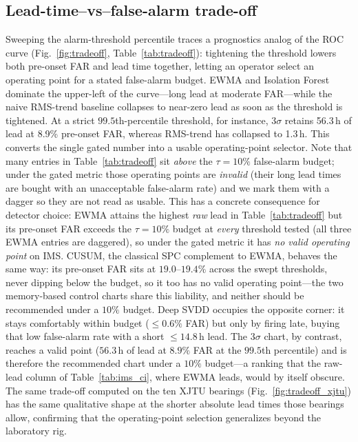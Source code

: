 \documentclass[journal]{IEEEtran}
\begin{document}
\subsection{Lead-time--vs--false-alarm trade-off}
Sweeping the alarm-threshold percentile traces a prognostics analog of the ROC
curve (Fig.~\ref{fig:tradeoff}, Table~\ref{tab:tradeoff}): tightening the
threshold lowers both pre-onset FAR and lead time together, letting an operator
select an operating point for a stated false-alarm budget. EWMA and Isolation
Forest dominate the upper-left of the curve---long lead at moderate FAR---while
the naive RMS-trend baseline collapses to near-zero lead as soon as the
threshold is tightened. At a strict $99.5$th-percentile threshold, for instance,
3$\sigma$ retains 56.3\,h of lead at 8.9\% pre-onset FAR, whereas RMS-trend has
collapsed to 1.3\,h. This converts the single gated number into a usable
operating-point selector. Note that many entries in Table~\ref{tab:tradeoff} sit
\emph{above} the $\tau{=}10\%$ false-alarm budget; under the gated metric those
operating points are \emph{invalid} (their long lead times are bought with an
unacceptable false-alarm rate) and we mark them with a dagger so they are not
read as usable. This has a concrete consequence for detector choice: EWMA attains
the highest \emph{raw} lead in Table~\ref{tab:tradeoff} but its pre-onset FAR
exceeds the $\tau{=}10\%$ budget at \emph{every} threshold tested (all three EWMA
entries are daggered), so under the gated metric it has \emph{no valid operating
point} on IMS. CUSUM, the classical SPC complement to EWMA, behaves the same way:
its pre-onset FAR sits at $19.0$--$19.4\%$ across the swept thresholds, never dipping
below the budget, so it too has no valid operating point---the two memory-based
control charts share this liability, and neither should be recommended under a
$10\%$ budget. Deep SVDD occupies the opposite corner: it stays comfortably within
budget ($\le0.6\%$ FAR) but only by firing late, buying that low false-alarm rate
with a short $\le14.8$\,h lead. The 3$\sigma$ chart, by contrast, reaches a valid point
($56.3$\,h of lead at $8.9\%$ FAR at the $99.5$th percentile) and is therefore the
recommended chart under a $10\%$ budget---a ranking that the raw-lead column of
Table~\ref{tab:ims_ci}, where EWMA leads, would by itself obscure. The same
trade-off computed on the ten XJTU bearings
(Fig.~\ref{fig:tradeoff_xjtu}) has the same qualitative shape at the shorter
absolute lead times those bearings allow, confirming that the operating-point
selection generalizes beyond the laboratory rig.
\end{document}
